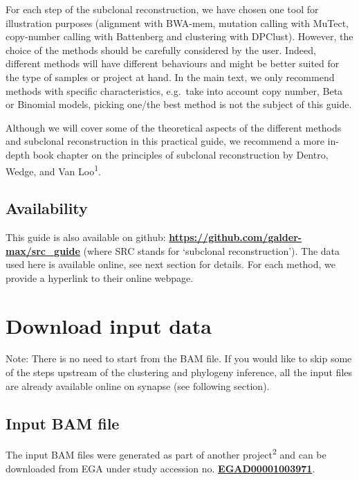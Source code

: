 \documentclass[]{article}
\begin{document}
For each step of the subclonal reconstruction, we have chosen one tool
for illustration purposes (alignment with BWA-mem, mutation calling with
MuTect, copy-number calling with Battenberg and clustering with
DPClust). However, the choice of the methods should be carefully
considered by the user. Indeed, different methods will have different
behaviours and might be better suited for the type of samples or project
at hand. In the main text, we only recommend methods with specific
characteristics, e.g.~take into account copy number, Beta or Binomial
models, picking one/the best method is not the subject of this guide.

Although we will cover some of the theoretical aspects of the different
methods and subclonal reconstruction in this practical guide, we
recommend a more in-depth book chapter on the principles of subclonal
reconstruction by Dentro, Wedge, and Van Loo\textsuperscript{1}.

\hypertarget{availability}{%
\subsection{Availability}\label{availability}}

This guide is also available on github:
\textbf{\url{https://github.com/galder-max/src_guide}} (where SRC stands
for `subclonal reconstruction'). The data used here is available online,
see next section for details. For each method, we provide a hyperlink to
their online webpage.

\newpage

\hypertarget{download-input-data}{%
\section{Download input data}\label{download-input-data}}

Note: There is no need to start from the BAM file. If you would like to
skip some of the steps upstream of the clustering and phylogeny
inference, all the input files are already available online on synapse
(see following section).

\hypertarget{input-bam-file}{%
\subsection{Input BAM file}\label{input-bam-file}}

The input BAM files were generated as part of another
project\textsuperscript{2} and can be downloaded from EGA under study
accession no.
\href{https://www.ebi.ac.uk/ega/studies/EGAS00001002092}{\textbf{EGAD00001003971}}.
\end{document}
